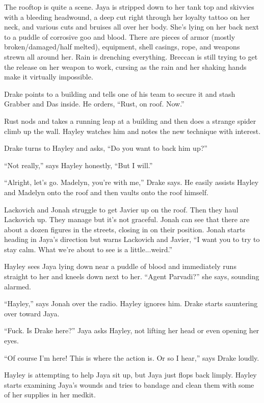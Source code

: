The rooftop is quite a scene.  Jaya is stripped down to her tank top and skivvies with a bleeding headwound, a deep cut right through her loyalty tattoo on her neck, and various cuts and bruises all over her body.  She's lying on her back next to a puddle of corrosive goo and blood.  There are pieces of armor (mostly broken/damaged/half melted), equipment, shell casings, rope, and weapons strewn all around her.  Rain is drenching everything.  Breccan is still trying to get the release on her weapon to work, cursing as the rain and her shaking hands make it virtually impossible.



Drake points to a building and tells one of his team to secure it and stash Grabber and Das inside.  He orders, ``Rust, on roof.  Now.'' 

Rust nods and takes a running leap at a building and then does a strange spider climb up the wall.  Hayley watches him and notes the new technique with interest.

Drake turns to Hayley and asks, ``Do you want to back him up?''

``Not really,'' says Hayley honestly, ``But I will.''

``Alright, let's go.  Madelyn, you're with me,'' Drake says.  He easily assists Hayley and Madelyn onto the roof and then vaults onto the roof himself.



Lackovich and Jonah struggle to get Javier up on the roof.  Then they haul Lackovich up.  They manage but it's not graceful.  Jonah can see that there are about a dozen figures in the streets, closing in on their position.  Jonah starts heading in Jaya's direction but warns Lackovich and Javier, ``I want you to try to stay calm. What we're about to see is a little...weird.''



Hayley sees Jaya lying down near a puddle of blood and immediately runs straight to her and kneels down next to her.  ``Agent Parvadi?'' she says, sounding alarmed.

``Hayley,'' says Jonah over the radio. Hayley ignores him.  Drake starts sauntering over toward Jaya.

``Fuck.  Is Drake here?'' Jaya asks Hayley, not lifting her head or even opening her eyes.

``Of course I'm here!  This is where the action is.  Or so I hear,'' says Drake loudly.

Hayley is attempting to help Jaya sit up, but Jaya just flops back limply.  Hayley starts examining Jaya's wounds and tries to bandage and clean them with some of her supplies in her medkit.

